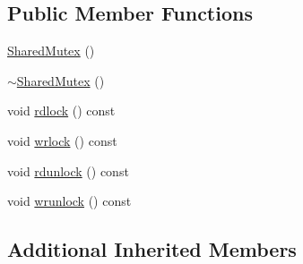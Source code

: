 \subsection*{Public Member Functions}
\begin{DoxyCompactItemize}
\item 
\hyperlink{classlog4cplus_1_1thread_1_1impl_1_1SharedMutex_af7e91148b011ce9a55326d462bf83214}{Shared\-Mutex} ()
\item 
\hyperlink{classlog4cplus_1_1thread_1_1impl_1_1SharedMutex_a5522c320428c76bb5e525cd16fec24af}{$\sim$\-Shared\-Mutex} ()
\item 
void \hyperlink{classlog4cplus_1_1thread_1_1impl_1_1SharedMutex_abcddaf747455f6c9c2a223d9d005a121}{rdlock} () const 
\item 
void \hyperlink{classlog4cplus_1_1thread_1_1impl_1_1SharedMutex_a0afa6ac1c1e9aa1c1f1eec64d1ca9568}{wrlock} () const 
\item 
void \hyperlink{classlog4cplus_1_1thread_1_1impl_1_1SharedMutex_a95fac160f18b35512097390221ced428}{rdunlock} () const 
\item 
void \hyperlink{classlog4cplus_1_1thread_1_1impl_1_1SharedMutex_a0e36032cb9825b287011f866260daaf6}{wrunlock} () const 
\end{DoxyCompactItemize}
\subsection*{Additional Inherited Members}



